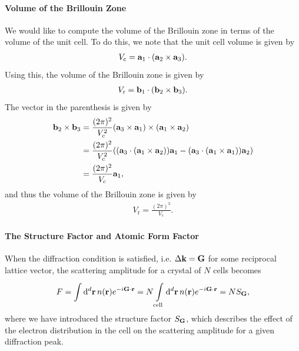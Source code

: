 \paragraph{Volume of the Brillouin Zone}
We would like to compute the volume of the Brillouin zone in terms of the volume of the unit cell. To do this, we note that the unit cell volume is given by
\begin{align*}
	V_{\text{c}} = \vb{a}_{1}\cdot(\vb{a}_{2}\times\vb{a}_{3}).
\end{align*}
Using this, the volume of the Brillouin zone is given by
\begin{align*}
	V_{\text{r}} = \vb{b}_{1}\cdot(\vb{b}_{2}\times\vb{b}_{3}).
\end{align*}
The vector in the parenthesis is given by
\begin{align*}
	\vb{b}_{2}\times\vb{b}_{3} &= \frac{(2\pi)^{2}}{V_{\text{c}}^{2}}(\vb{a}_{3}\times\vb{a}_{1})\times (\vb{a}_{1}\times\vb{a}_{2}) \\
	                           &= \frac{(2\pi)^{2}}{V_{\text{c}}^{2}}((\vb{a}_{3}\cdot(\vb{a}_{1}\times\vb{a}_{2}))\vb{a}_{1} - (\vb{a}_{3}\cdot(\vb{a}_{1}\times\vb{a}_{1}))\vb{a}_{2}) \\
	                           &= \frac{(2\pi)^{2}}{V_{\text{c}}}\vb{a}_{1},
\end{align*}
and thus the volume of the Brillouin zone is given by
\begin{align*}
	V_{\text{r}} = \frac{(2\pi)^{3}}{V_{\text{c}}}.
\end{align*}

\paragraph{The Structure Factor and Atomic Form Factor}
When the diffraction condition is satisfied, i.e. $\Delta\vb{k} = \vb{G}$ for some reciprocal lattice vector, the scattering amplitude for a crystal of $N$ cells becomes
\begin{align*}
	F = \integ[d]{}{}{\vb{r}}{n(\vb{r})e^{-i\vb{G}\cdot\vb{r}}} = N\integ[d]{\text{cell}}{}{\vb{r}}{n(\vb{r})e^{-i\vb{G}\cdot\vb{r}}} = NS_{\vb{G}},
\end{align*}
where we have introduced the structure factor $S_{\vb{G}}$, which describes the effect of the electron distribution in the cell on the scattering amplitude for a given diffraction peak.

